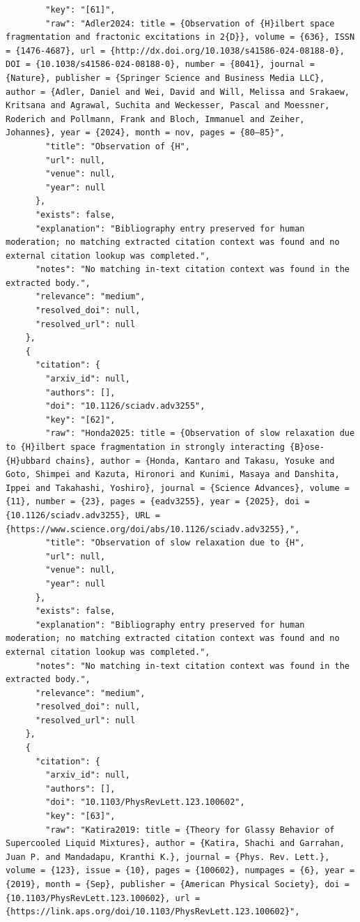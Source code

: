 \documentclass[11pt]{article}
\begin{document}
\begin{verbatim}
        "key": "[61]",
        "raw": "Adler2024: title = {Observation of {H}ilbert space fragmentation and fractonic excitations in 2{D}}, volume = {636}, ISSN = {1476-4687}, url = {http://dx.doi.org/10.1038/s41586-024-08188-0}, DOI = {10.1038/s41586-024-08188-0}, number = {8041}, journal = {Nature}, publisher = {Springer Science and Business Media LLC}, author = {Adler, Daniel and Wei, David and Will, Melissa and Srakaew, Kritsana and Agrawal, Suchita and Weckesser, Pascal and Moessner, Roderich and Pollmann, Frank and Bloch, Immanuel and Zeiher, Johannes}, year = {2024}, month = nov, pages = {80–85}",
        "title": "Observation of {H",
        "url": null,
        "venue": null,
        "year": null
      },
      "exists": false,
      "explanation": "Bibliography entry preserved for human moderation; no matching extracted citation context was found and no external citation lookup was completed.",
      "notes": "No matching in-text citation context was found in the extracted body.",
      "relevance": "medium",
      "resolved_doi": null,
      "resolved_url": null
    },
    {
      "citation": {
        "arxiv_id": null,
        "authors": [],
        "doi": "10.1126/sciadv.adv3255",
        "key": "[62]",
        "raw": "Honda2025: title = {Observation of slow relaxation due to {H}ilbert space fragmentation in strongly interacting {B}ose-{H}ubbard chains}, author = {Honda, Kantaro and Takasu, Yosuke and Goto, Shimpei and Kazuta, Hironori and Kunimi, Masaya and Danshita, Ippei and Takahashi, Yoshiro}, journal = {Science Advances}, volume = {11}, number = {23}, pages = {eadv3255}, year = {2025}, doi = {10.1126/sciadv.adv3255}, URL = {https://www.science.org/doi/abs/10.1126/sciadv.adv3255},",
        "title": "Observation of slow relaxation due to {H",
        "url": null,
        "venue": null,
        "year": null
      },
      "exists": false,
      "explanation": "Bibliography entry preserved for human moderation; no matching extracted citation context was found and no external citation lookup was completed.",
      "notes": "No matching in-text citation context was found in the extracted body.",
      "relevance": "medium",
      "resolved_doi": null,
      "resolved_url": null
    },
    {
      "citation": {
        "arxiv_id": null,
        "authors": [],
        "doi": "10.1103/PhysRevLett.123.100602",
        "key": "[63]",
        "raw": "Katira2019: title = {Theory for Glassy Behavior of Supercooled Liquid Mixtures}, author = {Katira, Shachi and Garrahan, Juan P. and Mandadapu, Kranthi K.}, journal = {Phys. Rev. Lett.}, volume = {123}, issue = {10}, pages = {100602}, numpages = {6}, year = {2019}, month = {Sep}, publisher = {American Physical Society}, doi = {10.1103/PhysRevLett.123.100602}, url = {https://link.aps.org/doi/10.1103/PhysRevLett.123.100602}",

\end{verbatim}
\end{document}
